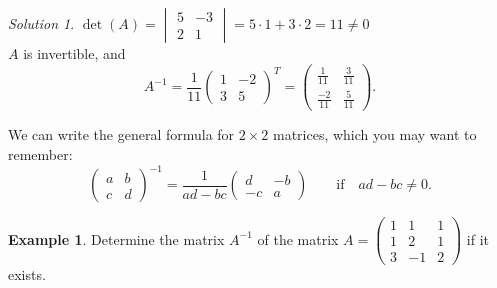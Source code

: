\documentclass[
  12pt,
  oneside]{book}
\theoremstyle{definition}
\theoremstyle{definition}
\newtheorem{example}{Example}[chapter]
\theoremstyle{definition}
\theoremstyle{definition}
\theoremstyle{remark}
\newtheorem*{solution}{Solution}
\begin{document}
\begin{solution}
\(\det(A)=\begin{vmatrix}5&-3\\2&1\end{vmatrix}=5\cdot1+3\cdot2=11\neq0\)\\
\(A\) is invertible, and
\[
A^{-1} = \frac{1}{11}\begin{pmatrix}1&-2\\3&5\end{pmatrix}^T
= \begin{pmatrix}\frac{1}{11}&\frac{3}{11}\\\frac{-2}{11}&\frac{5}{11}\end{pmatrix}.
\]
\end{solution}

We can write the general formula for \(2\times 2\) matrices, which you may want to remember:
\[
\begin{pmatrix}a&b\\c&d\end{pmatrix}^{-1} = \frac{1}{ad-bc} \begin{pmatrix}d&-b\\-c&a\end{pmatrix}\quad\quad
\text{if}\quad ad-bc\neq0.
\]

\begin{example}
Determine the matrix \(A^{-1}\) of the matrix \(A=\begin{pmatrix}1&1&1\\1&2&1\\3&-1&2\end{pmatrix}\) if it exists.
\end{example}
\end{document}
